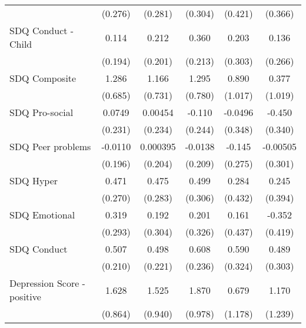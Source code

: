 {\begin{tabular}{l*{5}{c}}
            &     (0.276)         &     (0.281)         &     (0.304)         &     (0.421)         &     (0.366)         \\
\addlinespace
SDQ Conduct - Child&       0.114         &       0.212         &       0.360         &       0.203         &       0.136         \\
            &     (0.194)         &     (0.201)         &     (0.213)         &     (0.303)         &     (0.266)         \\
\addlinespace
SDQ Composite&       1.286         &       1.166         &       1.295         &       0.890         &       0.377         \\
            &     (0.685)         &     (0.731)         &     (0.780)         &     (1.017)         &     (1.019)         \\
\addlinespace
SDQ Pro-social&      0.0749         &     0.00454         &      -0.110         &     -0.0496         &      -0.450         \\
            &     (0.231)         &     (0.234)         &     (0.244)         &     (0.348)         &     (0.340)         \\
\addlinespace
SDQ Peer problems&     -0.0110         &    0.000395         &     -0.0138         &      -0.145         &    -0.00505         \\
            &     (0.196)         &     (0.204)         &     (0.209)         &     (0.275)         &     (0.301)         \\
\addlinespace
SDQ Hyper   &       0.471         &       0.475         &       0.499         &       0.284         &       0.245         \\
            &     (0.270)         &     (0.283)         &     (0.306)         &     (0.432)         &     (0.394)         \\
\addlinespace
SDQ Emotional&       0.319         &       0.192         &       0.201         &       0.161         &      -0.352         \\
            &     (0.293)         &     (0.304)         &     (0.326)         &     (0.437)         &     (0.419)         \\
\addlinespace
SDQ Conduct &       0.507\sym{*}  &       0.498\sym{*}  &       0.608\sym{**} &       0.590         &       0.489         \\
            &     (0.210)         &     (0.221)         &     (0.236)         &     (0.324)         &     (0.303)         \\
\addlinespace
Depression Score - positive&       1.628         &       1.525         &       1.870         &       0.679         &       1.170         \\
            &     (0.864)         &     (0.940)         &     (0.978)         &     (1.178)         &     (1.239)         \\
\bottomrule
\end{tabular}
}
